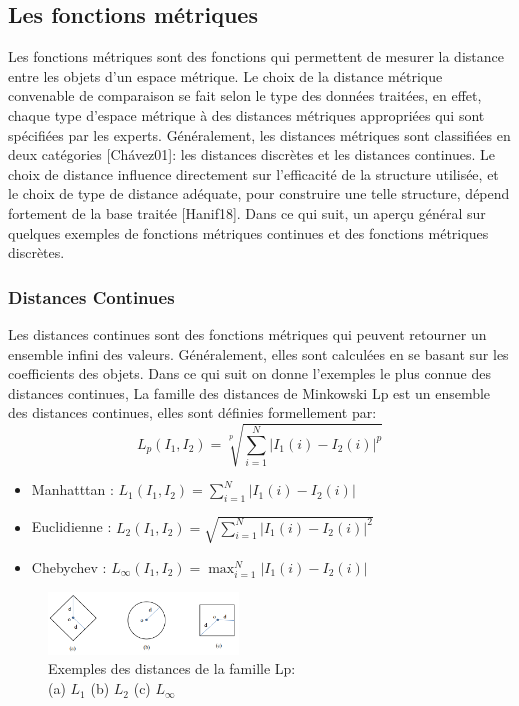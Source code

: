\subsection{Les fonctions métriques}
Les fonctions métriques sont des fonctions qui permettent de mesurer la distance entre les objets d’un espace métrique. Le choix de la distance métrique convenable de comparaison se fait selon le type des données traitées, en effet, chaque type d’espace métrique à des distances métriques appropriées qui sont spécifiées par les experts. Généralement, les distances métriques sont classifiées en deux catégories [Chávez01]: les distances discrètes et les distances continues. Le choix de distance influence directement sur l’efficacité de la structure utilisée, et le choix de type de distance adéquate, pour construire une telle structure, dépend fortement de la base traitée [Hanif18]. Dans ce qui suit, un aperçu général sur quelques exemples de fonctions métriques continues et des fonctions métriques discrètes.

\subsubsection{Distances Continues}
Les distances continues sont des fonctions métriques qui peuvent retourner un ensemble infini des valeurs. Généralement, elles sont calculées en se basant sur les coefficients des objets. Dans ce qui suit  on donne l'exemples le plus connue des distances continues, La famille des distances de Minkowski Lp est un ensemble des distances continues, elles sont définies formellement par:
\begin{equation}
L_p(I_1, I_2) = \sqrt[p]{\sum_{i=1}^{N}  \left|{I}_{1}(i)-{I}_{2}(i)\right|^p} 
\end{equation}

\begin{itemize}
	\item Manhatttan :  $  L_1(I_1, I_2) = \sum_{i=1}^{N} \left|{I}_{1}(i)-{I}_{2}(i)\right|  $ 
	
	\item Euclidienne : $ L_2(I_1, I_2) =  \sqrt{\sum_{i=1}^{N} \left|{I}_{1}(i)-{I}_{2}(i)\right|^2} $
	
	\item Chebychev : 
	$L_{\infty}(I_1, I_2)=\max_{i=1}^N \left|{I}_{1}(i)-{I}_{2}(i)\right|$  
\end{itemize}

\begin{figure}[H]
	\centering
	\includegraphics[width=0.45\textwidth]{Figures/mink} %
	\caption{Exemples des distances de la famille Lp:\\ (a) $ L_1 $ (b) $ L_2 $ (c) 	$L_{\infty}$}
\end{figure}

